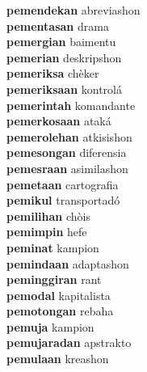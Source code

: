\textbf{pemendekan } abreviashon \\
\textbf{pementasan } drama \\
\textbf{pemergian } baimentu \\
\textbf{pemerian } deskripshon \\
\textbf{pemeriksa } chèker \\
\textbf{pemeriksaan } kontrolá \\
\textbf{pemerintah } komandante \\
\textbf{pemerkosaan } ataká \\
\textbf{pemerolehan } atkisishon \\
\textbf{pemesongan } diferensia \\
\textbf{pemesraan } asimilashon \\
\textbf{pemetaan } cartografia \\
\textbf{pemikul } transportadó \\
\textbf{pemilihan } chòis \\
\textbf{pemimpin } hefe \\
\textbf{peminat } kampion \\
\textbf{pemindaan } adaptashon \\
\textbf{peminggiran } rant \\
\textbf{pemodal } kapitalista \\
\textbf{pemotongan } rebaha \\
\textbf{pemuja } kampion \\
\textbf{pemujaradan } apstrakto \\
\textbf{pemulaan } kreashon \\
